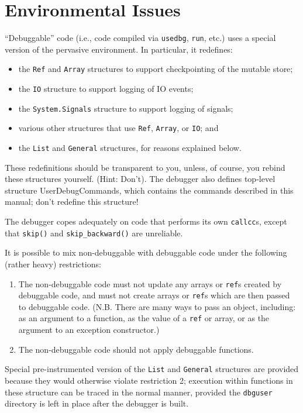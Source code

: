 \section{Environmental Issues}
\label{sec:environment}
``Debuggable'' code (i.e., code compiled via  \verb'usedbg', \verb'run', etc.)
uses a special version of the pervasive environment.  In particular, it 
redefines:
\begin{itemize}
\item the {\tt Ref} and {\tt Array} 
structures to support checkpointing of the mutable store;
\item the {\tt IO} structure to support logging of IO events;
\item the {\tt System.Signals} structure to support logging of signals;
\item various other structures that use {\tt Ref}, {\tt Array}, or {\tt IO}; 
and
\item the {\tt List} and {\tt General} structures, for reasons explained below.
\end{itemize}
These redefinitions should be transparent to you, unless, of course, you
rebind these structures yourself. (Hint: Don't).  The debugger also defines
top-level structure UserDebugCommands, which contains
the commands described in this manual; don't redefine this structure! 

The debugger copes adequately on code that performs its own \verb'callcc's,
except that \verb'skip()' and \verb'skip_backward()' are unreliable.

It is possible to mix non-debuggable with debuggable code under the
following (rather heavy) restrictions:
\begin{enumerate}
\item The non-debuggable code must not update any arrays or 
{\tt ref}s created by
debuggable code, and must not create arrays or {\tt ref}s which are then passed
to debuggable code.  (N.B. There are many ways to pass an object, including:
as an argument to a function, as the value of a {\tt ref} or array, or as the
argument to an exception constructor.)
\item The non-debuggable code should not apply debuggable functions. 
\end{enumerate}
Special pre-instrumented 
version of the {\tt List} and {\tt General} structures are
provided because they would otherwise violate
restriction 2; execution within functions in these structure can be traced
in the normal manner, provided the {\tt dbguser} directory is left in 
place after the debugger is built.

